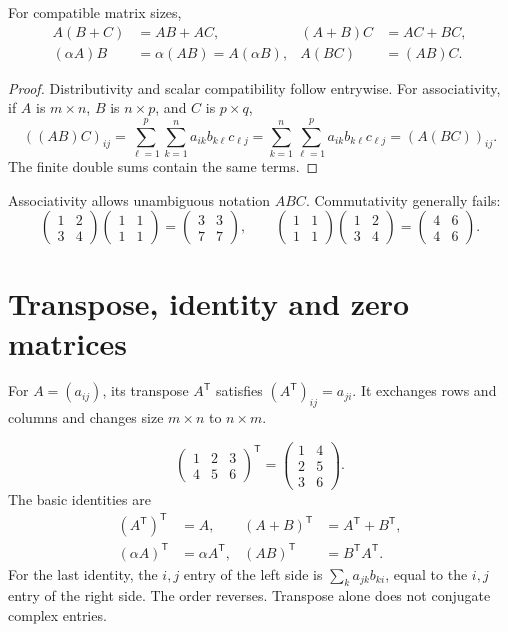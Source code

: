 \begin{proposition}
For compatible matrix sizes,
\begin{align*}
A(B+C)&=AB+AC,&(A+B)C&=AC+BC,\\
(\alpha A)B&=\alpha(AB)=A(\alpha B),&
A(BC)&=(AB)C.
\end{align*}
\end{proposition}
\begin{proof}
Distributivity and scalar compatibility follow entrywise. For associativity,
if $A$ is $m\times n$, $B$ is $n\times p$, and $C$ is $p\times q$,
\[
((AB)C)_{ij}=\sum_{\ell=1}^p\sum_{k=1}^n a_{ik}b_{k\ell}c_{\ell j}
=\sum_{k=1}^n\sum_{\ell=1}^p a_{ik}b_{k\ell}c_{\ell j}
=(A(BC))_{ij}.
\]
The finite double sums contain the same terms.
\end{proof}
Associativity allows unambiguous notation $ABC$. Commutativity generally fails:
\[
\begin{pmatrix}1&2\\3&4\end{pmatrix}
\begin{pmatrix}1&1\\1&1\end{pmatrix}
=\begin{pmatrix}3&3\\7&7\end{pmatrix},\qquad
\begin{pmatrix}1&1\\1&1\end{pmatrix}
\begin{pmatrix}1&2\\3&4\end{pmatrix}
=\begin{pmatrix}4&6\\4&6\end{pmatrix}.
\]

\section{Transpose, identity and zero matrices}
\begin{definition}[Transpose]
For $A=(a_{ij})$, its transpose $A^{\mathsf T}$ satisfies
$(A^{\mathsf T})_{ij}=a_{ji}$. It exchanges rows and columns and changes
size $m\times n$ to $n\times m$.
\end{definition}
\[
\begin{pmatrix}1&2&3\\4&5&6\end{pmatrix}^{\mathsf T}
=\begin{pmatrix}1&4\\2&5\\3&6\end{pmatrix}.
\]
The basic identities are
\begin{align*}
(A^{\mathsf T})^{\mathsf T}&=A,&
(A+B)^{\mathsf T}&=A^{\mathsf T}+B^{\mathsf T},\\
(\alpha A)^{\mathsf T}&=\alpha A^{\mathsf T},&
(AB)^{\mathsf T}&=B^{\mathsf T}A^{\mathsf T}.
\end{align*}
For the last identity, the $i,j$ entry of the left side is
$\sum_k a_{jk}b_{ki}$, equal to the $i,j$ entry of the right side.
The order reverses. Transpose alone does not conjugate complex entries.

